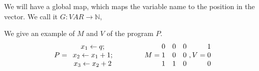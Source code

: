 \documentclass[a4paper,11pt]{article}
\begin{document}
We will have a global map, which maps the variable name to the position in the vector. We call it $G: VAR \to \mathbb{N}$,

We give an example of $M$ and $V$ of the program $P$. 
$$
P= \begin{array}{c}
\mathrel{ x_1 \leftarrow q } ;        \\
\mathrel{ x_2 \leftarrow x_1+1 } ;\\
\mathrel{ x_3 \leftarrow x_2+2 } 
\end{array}~~~~~~~~~~~~
M =  \begin{matrix}
 0 & 0 & 0 \\
1 & 0 & 0 \\
1 & 1 & 0 \\
\end{matrix} ~ , V = \begin{matrix}
  1 \\
 0 \\
 0 \\
\end{matrix}
$$
\end{document}
